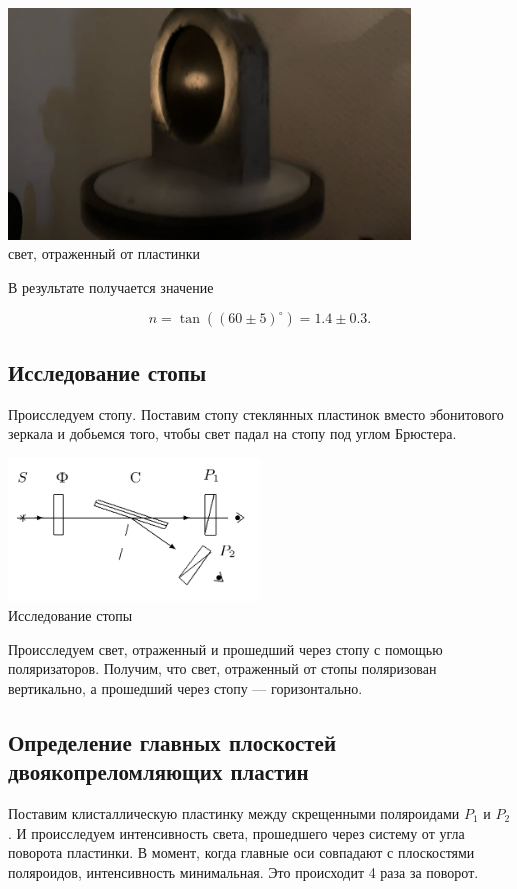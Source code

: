 \begin{center}
\includegraphics[width=0.80\textwidth]{3.png}\\
свет, отраженный от пластинки
\end{center}

В результате получается значение

\[n=\tan((60 \pm 5)^\circ)=1.4\pm0.3.\]

\subsection*{Исследование стопы}
Происследуем стопу. Поставим стопу стеклянных пластинок вместо эбонитового зеркала и добьемся того, чтобы свет падал на стопу под углом Брюстера.

\begin{center}
\includegraphics[width=0.50\textwidth]{4.png}\\
Исследование стопы
\end{center}

Происследуем свет, отраженный и прошедший через стопу с помощью поляризаторов. Получим, что свет, отраженный от стопы поляризован вертикально, а прошедший через стопу --- горизонтально.

\subsection*{Определение главных плоскостей двоякопреломляющих пластин}

Поставим клисталлическую пластинку между скрещенными поляроидами $P_1$ и $P_2$. И происследуем интенсивность света, прошедшего через систему от угла поворота пластинки. В момент, когда главные оси совпадают с плоскостями поляроидов, интенсивность минимальная. Это происходит 4 раза за поворот.




